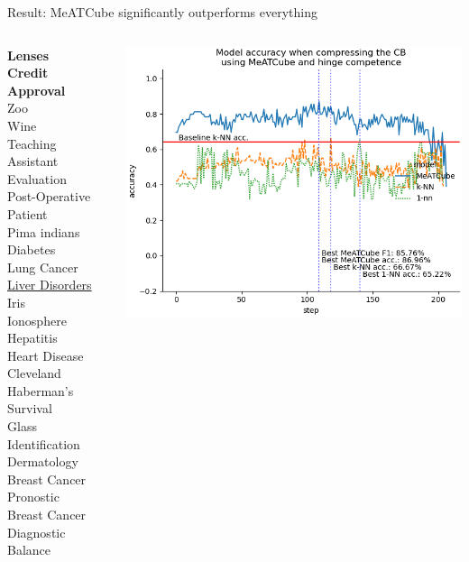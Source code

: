 \documentclass[]{beamer}
\begin{document}
\begin{frame}{Result: MeATCube significantly outperforms everything}
    \begin{columns}
        \begin{column}{.35\textwidth}
            {\smaller\smaller
            \textbf{Lenses} \\
            \textbf{Credit Approval} \\
            Zoo \\
            Wine \\
            Teaching Assistant Evaluation \\
            Post-Operative Patient \\
            Pima indians Diabetes \\
            Lung Cancer \\
            \underline{Liver Disorders} \\
            Iris \\
            Ionosphere \\
            Hepatitis \\
            Heart Disease Cleveland \\
            Haberman's Survival \\
            Glass Identification \\
            Dermatology \\
            Breast Cancer Pronostic \\
            Breast Cancer Diagnostic \\
            Balance\\
            ~}
        \end{column}
        \begin{column}{.65\textwidth}
            \includegraphics[width=.8\textwidth]{../results/figs/liver+disorders.png}

\end{column}
\end{columns}
\end{frame}
\end{document}
